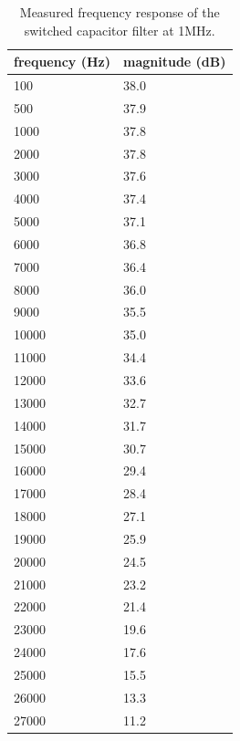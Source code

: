 \begin{table}[!ht]
    \centering
    \begin{tabular}{|l|l|}
    \hline
        frequency (Hz) & magnitude (dB) \\ \hline \hline
        100 & 38.0 \\ \hline
        500 & 37.9 \\ \hline
        1000 & 37.8 \\ \hline
        2000 & 37.8 \\ \hline
        3000 & 37.6 \\ \hline
        4000 & 37.4 \\ \hline
        5000 & 37.1 \\ \hline
        6000 & 36.8 \\ \hline
        7000 & 36.4 \\ \hline
        8000 & 36.0 \\ \hline
        9000 & 35.5 \\ \hline
        10000 & 35.0 \\ \hline
        11000 & 34.4 \\ \hline
        12000 & 33.6 \\ \hline
        13000 & 32.7 \\ \hline
        14000 & 31.7 \\ \hline
        15000 & 30.7 \\ \hline
        16000 & 29.4 \\ \hline
        17000 & 28.4 \\ \hline
        18000 & 27.1 \\ \hline
        19000 & 25.9 \\ \hline
        20000 & 24.5 \\ \hline
        21000 & 23.2 \\ \hline
        22000 & 21.4 \\ \hline
        23000 & 19.6 \\ \hline
        24000 & 17.6 \\ \hline
        25000 & 15.5 \\ \hline
        26000 & 13.3 \\ \hline
        27000 & 11.2 \\ \hline
    \end{tabular}
    \captionsetup{justification=centering,singlelinecheck=true}
        \caption{Measured frequency response of the switched capacitor filter at 1MHz.}
\label{tab:Messermunt_4}
\end{table}